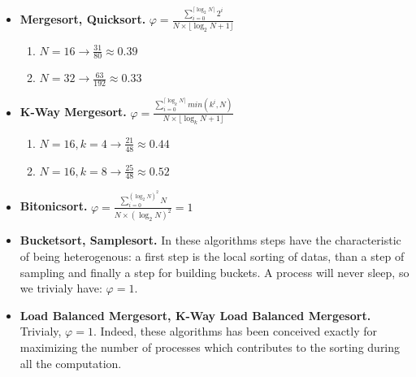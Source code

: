 \begin{itemize}
\item \textbf{Mergesort, Quicksort.} $\varphi = \frac{\sum_{i=0}^{ \lceil \log_2{N} \rceil} 2^i}{N \times \lfloor \log_2{N} + 1 \rfloor} $
\begin{enumerate}
\item $N = 16 \rightarrow \frac{31}{80} \approx 0.39$
\item $N = 32 \rightarrow \frac{63}{192} \approx 0.33$
\end{enumerate}

\item \textbf{K-Way Mergesort.} $\varphi = \frac{\sum_{i=0}^{ \lceil \log_k{N} \rceil} min ( k^i, N )}{N \times \lfloor \log_k{N} + 1 \rfloor } $
\begin{enumerate}
\item $N = 16, k = 4 \rightarrow \frac{21}{48} \approx 0.44$
\item $N = 16, k = 8 \rightarrow \frac{25}{48} \approx 0.52$
\end{enumerate}

\item \textbf{Bitonicsort.} $\varphi = \frac{\sum_{i=0}^{(\log_2{N})^2} N}{N \times (\log_2{N})^2} = 1 $
\item \textbf{Bucketsort, Samplesort.} In these algorithms steps have the characteristic of being heterogenous: a first step is the local sorting of datas, than a step of sampling and finally a step for building buckets. A process will never sleep, so we trivialy have: $\varphi = 1$.

\item \textbf{Load Balanced Mergesort, K-Way Load Balanced Mergesort.} Trivialy, $\varphi = 1$. Indeed, these algorithms has been conceived exactly for maximizing the number of processes which contributes to the sorting during all the computation.

\end{itemize}
